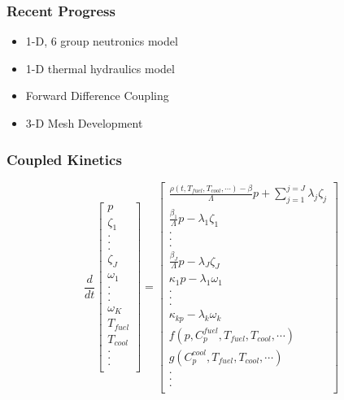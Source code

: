 
\begin{frame}[fragile]
  \frametitle{Recent Progress}
  \begin{itemize}
    \item 1-D, 6 group neutronics model
    \item 1-D thermal hydraulics model
    \item Forward Difference Coupling 
    \item 3-D Mesh Development
  \end{itemize}
\end{frame}

\begin{frame}[fragile]
  \frametitle{Coupled Kinetics}
  \footnotesize{
\begin{equation} 
  \frac{d}{dt}\left[
    \begin{array}{c}
      p\\
      \zeta_1\\
      .\\
      .\\
      .\\
      \zeta_J\\
      \omega_1\\
      .\\
      .\\
      .\\
      \omega_K\\
      T_{fuel}\\
      T_{cool}\\
      .\\
      .\\
      .\\
    \end{array}
    \right]
    =
    \left[
      \begin{array}{ c }
        \frac{\rho(t,T_{fuel},T_{cool},\cdots)-\beta}{\Lambda}p + 
        \displaystyle\sum^{j=J}_{j=1}\lambda_j\zeta_j\\
        \frac{\beta_1}{\Lambda} p - \lambda_1\zeta_1\\
        .\\
        .\\
        .\\
        \frac{\beta_J}{\Lambda}p-\lambda_J\zeta_J\\
        \kappa_1p - \lambda_1\omega_1\\
        .\\
        .\\
        .\\
        \kappa_{k p} - \lambda_k\omega_{k}\\
        f(p, C_p^{fuel}, T_{fuel}, T_{cool},\cdots)\\
        g(C_p^{cool}, T_{fuel}, T_{cool},\cdots)\\
        .\\
        .\\
        .\\
      \end{array}
      \right]
      \label{eqn:ourPRKE}
    \end{equation}
  
}
\end{frame}

